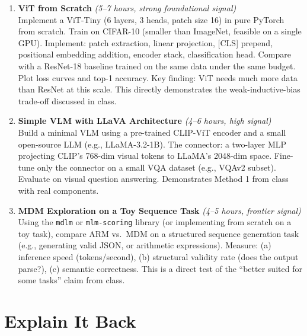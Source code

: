 \documentclass[11pt, a4paper]{article}
\begin{document}
\begin{enumerate}[leftmargin=2em]
  \item \textbf{ViT from Scratch} \textit{(5--7 hours, strong foundational signal)}\\
  Implement a ViT-Tiny (6 layers, 3 heads, patch size 16) in pure PyTorch from scratch. Train on CIFAR-10 (smaller than ImageNet, feasible on a single GPU). Implement: patch extraction, linear projection, [CLS] prepend, positional embedding addition, encoder stack, classification head. Compare with a ResNet-18 baseline trained on the same data under the same budget. Plot loss curves and top-1 accuracy. Key finding: ViT needs much more data than ResNet at this scale. This directly demonstrates the weak-inductive-bias trade-off discussed in class.

  \item \textbf{Simple VLM with LLaVA Architecture} \textit{(4--6 hours, high signal)}\\
  Build a minimal VLM using a pre-trained CLIP-ViT encoder and a small open-source LLM (e.g., LLaMA-3.2-1B). The connector: a two-layer MLP projecting CLIP's 768-dim visual tokens to LLaMA's 2048-dim space. Fine-tune only the connector on a small VQA dataset (e.g., VQAv2 subset). Evaluate on visual question answering. Demonstrates Method 1 from class with real components.

  \item \textbf{MDM Exploration on a Toy Sequence Task} \textit{(4--5 hours, frontier signal)}\\
  Using the \texttt{mdlm} or \texttt{mlm-scoring} library (or implementing from scratch on a toy task), compare ARM vs.\ MDM on a structured sequence generation task (e.g., generating valid JSON, or arithmetic expressions). Measure: (a) inference speed (tokens/second), (b) structural validity rate (does the output parse?), (c) semantic correctness. This is a direct test of the ``better suited for some tasks'' claim from class.
\end{enumerate}

\newpage
\section{Explain It Back}
\end{document}

